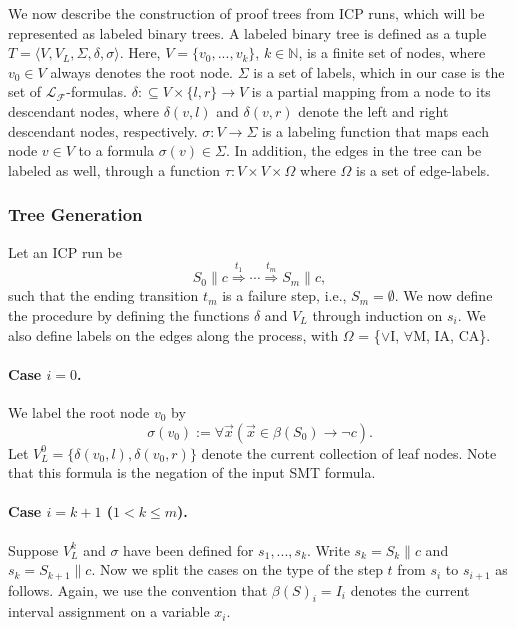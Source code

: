 \documentclass[envcountsect]{llncs}
\begin{document}
We now describe the construction of proof trees from ICP runs, which will be 
represented as labeled binary trees. A labeled binary tree is defined as a
tuple $T =
\langle V, V_L,  \Sigma, \delta, \sigma\rangle$. Here, $V = \{v_0, ..., v_k\}$,
$k\in \mathbb{N}$, is a finite set of nodes, where $v_0\in V$ always denotes the
root
node. $\Sigma$ is a set of labels, which in our case is the set of
$\mathcal{L}_\mathcal{F}$-formulas. $\delta:\subseteq V\times \{l,r\}
\rightarrow V$ is a
partial mapping from a node to its descendant nodes, where $\delta(v, l)$ and
$\delta(v, r)$ denote the left and right descendant nodes, respectively.
$\sigma: V\rightarrow \Sigma$ is a labeling function that maps each node
$v\in V$ to a formula $\sigma(v) \in \Sigma$. In addition, the edges in the
tree can be labeled as well, through a function $\tau: V\times V\times \Omega$
where $\Omega$ is a set of edge-labels. 

\subsubsection{Tree Generation} Let an ICP run be
$$S_0\parallel c\stackrel{t_1}{\Longrightarrow}\cdots
\stackrel{t_m}{\Longrightarrow} S_m\parallel c,$$
such that the ending transition $t_m$ is a failure step, i.e., $S_m=\emptyset$.
We now define the procedure by defining the functions $\delta$ and
$V_L$ through induction on $s_i$. We also define labels on the edges along the
process, with $\Omega$ = \{{$\vee$I}, $\forall$M, IA, CA\}. 

\paragraph{Case $i= 0$.} We label the root node $v_0$ by 
$$\sigma(v_0) := \forall \vec x( \vec x\in \beta(S_0) \rightarrow \neg c).$$
Let $V_L^0= \{\delta(v_0,l), \delta(v_0, r)\}$ denote the current
collection of leaf nodes. Note that this formula is the negation of the input
SMT formula. 




\paragraph{Case $i = k+1$ ($1< k \leq m$). }
Suppose $V_L^k$ and $\sigma$ have been defined for $s_1, ...,s_k$. Write
$s_k = S_k
\parallel c$ and $s_k = S_{k+1} \parallel c$. Now we split
the cases on the type of the step $t$ from $s_i$ to $s_{i+1}$ as follows.
Again, we use the convention that $\beta(S)_i = I_i$ denotes the current
interval assignment on a variable $x_i$. 
\end{document}
